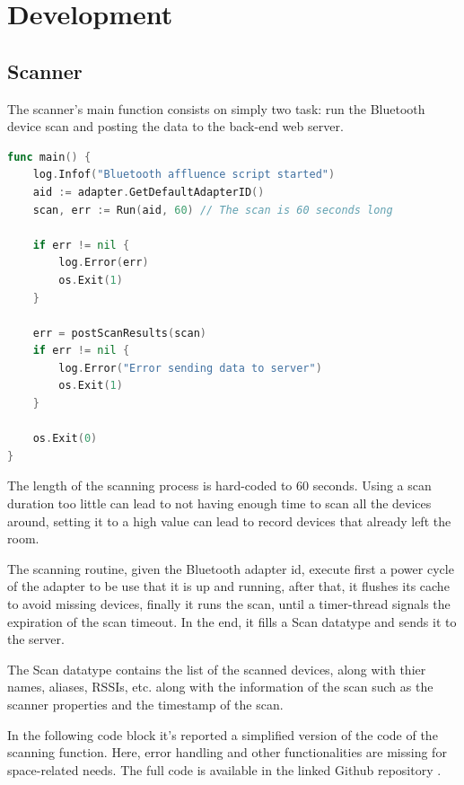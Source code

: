 \documentclass[a4paper, 11pt]{article}
\begin{document}
\section{Development}
\subsection{Scanner}
The scanner's main function consists on simply two task: run the Bluetooth device scan and posting the data to the back-end web server.

\begin{lstlisting}[language=Go]
func main() {
	log.Infof("Bluetooth affluence script started")
	aid := adapter.GetDefaultAdapterID()
	scan, err := Run(aid, 60) // The scan is 60 seconds long
	
	if err != nil {
		log.Error(err)
		os.Exit(1)
	}

	err = postScanResults(scan)
	if err != nil {
		log.Error("Error sending data to server")
		os.Exit(1)
	}

	os.Exit(0)
}

\end{lstlisting}

The length of the scanning process is hard-coded to 60 seconds. Using a scan duration too little can lead to not having enough time to scan all the devices around, setting it to a high value can lead to record devices that already left the room.

The scanning routine, given the Bluetooth adapter id, execute first a power cycle of the adapter to be use that it is up and running, after that, it flushes its cache to avoid missing devices, finally it runs the scan, until a timer-thread signals the expiration of the scan timeout. In the end, it fills a Scan datatype and sends it to the server.

The Scan datatype contains the list of the scanned devices, along with thier names, aliases, RSSIs, etc. along with the information of the scan such as the scanner properties and the timestamp of the scan.

In the following code block it's reported a simplified version of the code of the scanning function. Here, error handling and other functionalities are missing for space-related needs. The full code is available in the linked Github repository \cite{repo}. 
\end{document}
